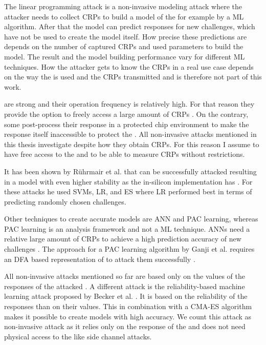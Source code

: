 The linear programming attack is a non-invasive modeling attack where the attacker needs to collect \acp{CRP} to build a model of the \puf for example by a \ac{ML} algorithm.
After that the model can predict responses for new challenges, which have not be used to create the model itself.
How precise these predictions are depends on the number of captured \acp{CRP} and used parameters to build the model. %
The result and the model building performance vary for different \ac{ML} techniques.
How the attacker gets to know the \acp{CRP} in a real use case depends on the way the \puf is used and the \acp{CRP} transmitted and is therefore not part of this work. %

\apufs are strong \pufs and their operation frequency is relatively high.
For that reason they provide the option to freely access a large amount of \acp{CRP} \cite{Ruhrmair2010ModelingFunctions}. %
On the contrary, some \pufs post-process their response in a protected chip environment to make the \puf response itself inaccessible to protect the \puf \cite{Suh2007PhysicalGeneration, Gassend2004IdentificationCircuits}.
All non-invasive attacks mentioned in this thesis investigate \pufs despite how they obtain \acp{CRP}.
For this reason I assume to have free access to the \puf and to be able to measure \acp{CRP} without restrictions.

It has been shown by Rührmair et al. that \apufs can be successfully attacked resulting in a model with even higher stability as the \apuf in-silicon implementation has \cite{Ruhrmair2010ModelingFunctions}.
For these attacks he used \acp{SVM}, \ac{LR}, and \ac{ES} where \ac{LR} performed best in terms of predicting randomly chosen challenges. %

Other techniques to create accurate \apuf models are \ac{ANN} and \ac{PAC} learning, whereas \ac{PAC} learning is an analysis framework and not a \ac{ML} technique. %
\acp{ANN} need a relative large amount of \acp{CRP} to achieve a high prediction accuracy of new challenges \cite{Hospodar2012MachineUsability}.
The approach for a \ac{PAC} learning algorithm by Ganji et al. requires an \ac{DFA} based representation of \apufs to attack them successfully \cite{Ganji2016PACPUFs}.

All non-invasive attacks mentioned so far are based only on the values of the responses of the attacked \puf.
A different attack is the reliability-based machine learning attack proposed by Becker et al. \cite{Becker2015ThePUFs}. %
It is based on the reliability of the \puf responses than on their values. 
This in combination with a \ac{CMA-ES} algorithm makes it possible to create \apuf models with high accuracy.
We count this attack as non-invasive attack as it relies only on the response of the \puf and does not need physical access to the \puf like side channel attacks.

